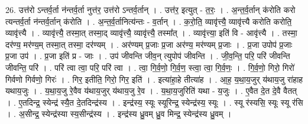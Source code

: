 \documentclass[17pt]{extarticle}
\begin{document}
26. उत्त॑रो ऽन्तर्व॒र्ता न॑न्तर्व॒र्ता नुत्त॑र॒ उत्त॑रो ऽन्तर्व॒र्तान् । . उत्त॑र॒ इत्युत् - त॒रः॒ । . अ॒न्त॒र्व॒र्तान् क॑रोति करो त्यन्तर्व॒र्ता न॑न्तर्व॒र्तान् क॑रोति । . अ॒न्त॒र्व॒र्तानित्य॑न्तः - व॒र्तान् । . क॒रो॒ति॒ व्यावृ॑त्त्यै॒ व्यावृ॑त्त्यै करोति करोति॒ व्यावृ॑त्त्यै । . व्यावृ॑त्त्यै॒ तस्मा॒त् तस्मा॒द् व्यावृ॑त्त्यै॒ व्यावृ॑त्त्यै॒ तस्मा᳚त् । . व्यावृ॑त्त्या॒ इति॑ वि - आवृ॑त्त्यै । . तस्मा॒ दर॑ण्य॒ मर॑ण्य॒म् तस्मा॒त् तस्मा॒ दर॑ण्यम् । . अर॑ण्यम् प्र॒जाः प्र॒जा अर॑ण्य॒ मर॑ण्यम् प्र॒जाः । . प्र॒जा उपोप॑ प्र॒जाः प्र॒जा उप॑ । . प्र॒जा इति॑ प्र - जाः । . उप॑ जीवन्ति जीव॒न् त्युपोप॑ जीवन्ति । . जी॒व॒न्ति॒ परि॒ परि॑ जीवन्ति जीवन्ति॒ परि॑ । . परि॑ त्वा त्वा॒ परि॒ परि॑ त्वा । . त्वा॒ गि॒र्व॒णो॒ गि॒र्व॒ण॒ स्त्वा॒ त्वा॒ गि॒र्व॒णः॒ । . गि॒र्व॒णो॒ गिरो॒ गिरो॑ गिर्वणो गिर्वणो॒ गिरः॑ । . गिर॒ इतीति॒ गिरो॒ गिर॒ इति॑ । . इत्या॑हा॒हे तीत्या॑ह । . आ॒ह॒ य॒था॒य॒जुर् य॑थाय॒जु रा॑हाह यथाय॒जुः । . य॒था॒य॒जु रे॒वैव य॑थाय॒जुर् य॑थाय॒जु रे॒व । . य॒था॒य॒जुरिति॑ यथा - य॒जुः । . ए॒वैत दे॒त दे॒वै वैतत् । . ए॒तदिन्द्र॒ स्येन्द्र॑ स्यै॒त दे॒तदिन्द्र॑स्य । . इन्द्र॑स्य॒ स्यूः स्यूरिन्द्र॒ स्येन्द्र॑स्य॒ स्यूः । . स्यू र॑स्यसि॒ स्यूः स्यू र॑सि । . अ॒सीन्द्र॒ स्येन्द्र॑स्या स्य॒सीन्द्र॑स्य । . इन्द्र॑स्य ध्रु॒वम् ध्रु॒व मिन्द्र॒ स्येन्द्र॑स्य ध्रु॒वम् । \newline
\end{document}

